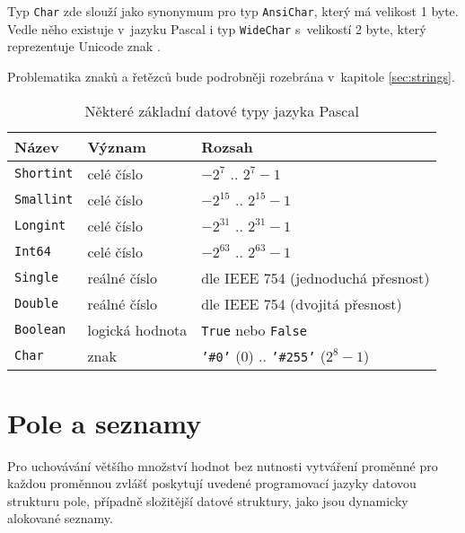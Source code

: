 \documentclass{bakalarka}
\begin{document}
Typ \texttt{Char} zde slouží jako synonymum pro typ \texttt{AnsiChar}, který má velikost 1 byte. Vedle něho existuje v~jazyku Pascal i typ \texttt{WideChar} s~velikostí 2 byte, který reprezentuje Unicode znak \cite{pas-guide-types, pas-guide-ansichar, pas-guide-widechar}.\par

Problematika znaků a řetězců bude podrobněji rozebrána v~kapitole \ref{sec:strings}.

\begin{table}\centering
\caption{Některé základní datové typy jazyka Pascal}
\begin{tabular}{| l | l | l |}
\hline
\textbf{Název} & \textbf{Význam} & \textbf{Rozsah} \\ \hline
\texttt{Shortint} & celé číslo & $-2^7$ .. $2^7-1$ \\ \hline
\texttt{Smallint} & celé číslo & $-2^{15}$ .. $2^{15}-1$ \\ \hline
\texttt{Longint} & celé číslo & $-2^{31}$ .. $2^{31}-1$ \\ \hline
\texttt{Int64} & celé číslo & $-2^{63}$ .. $2^{63}-1$ \\ \hline
\texttt{Single} & reálné číslo & dle IEEE 754 (jednoduchá přesnost) \\ \hline
\texttt{Double} & reálné číslo & dle IEEE 754 (dvojitá přesnost) \\ \hline
\texttt{Boolean} & logická hodnota & \texttt{True} nebo \texttt{False} \\ \hline
\texttt{Char} & znak & \texttt{'\#0'} ($0$) .. \texttt{'\#255'} ($2^{8} - 1$) \\ \hline
\end{tabular}
\label{table:pas-types}
\end{table}

\section{Pole a seznamy}
Pro uchovávání většího množství hodnot bez nutnosti vytváření proměnné pro každou proměnnou zvlášť poskytují uvedené programovací jazyky datovou strukturu pole, případně složitější datové struktury, jako jsou dynamicky alokované seznamy.
\end{document}
